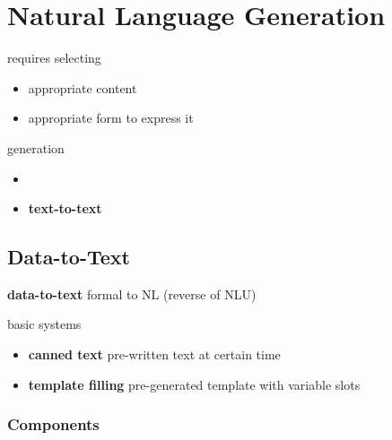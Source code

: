 \documentclass[]{article}
\theoremstyle{definition}
\begin{document}
\section{Natural Language Generation}%
\label{sec:natural_language_generation}

requires selecting
\begin{itemize}
    \item appropriate content
    \item appropriate form to express it
\end{itemize}

generation
\begin{itemize}
    \item
    \item \textbf{text-to-text}
\end{itemize}

\subsection{Data-to-Text}%
\label{sub:data_to_text}

\textbf{data-to-text} formal to NL (reverse of NLU)

basic systems
\begin{itemize}
    \item \textbf{canned text} pre-written text at certain time
    \item \textbf{template filling} pre-generated template with variable slots
\end{itemize}

\subsubsection{Components}%
\label{ssub:components}
\end{document}
